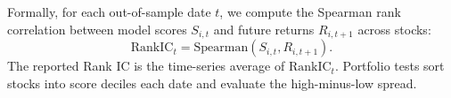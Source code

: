 Formally, for each out-of-sample date $t$, we compute the Spearman rank correlation between model scores $S_{i,t}$ and future returns $R_{i,t+1}$ across stocks:
\begin{equation}
  \mathrm{RankIC}_t = \mathrm{Spearman}\left(S_{i,t}, R_{i,t+1}\right).
\end{equation}
The reported Rank IC is the time-series average of $\mathrm{RankIC}_t$. Portfolio tests sort stocks into score deciles each date and evaluate the high-minus-low spread.

